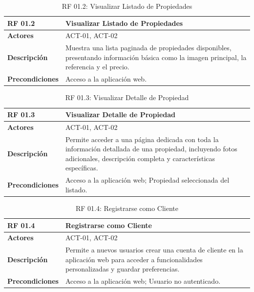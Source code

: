 \begin{table}[H]
\centering
\begin{tabular}{|p{3cm}|p{10cm}|}
\hline
\rowcolor{tealblue}
\textbf{RF 01.2} & \textbf{Visualizar Listado de Propiedades} \\
\hline
\textbf{Actores} & ACT-01, ACT-02 \\
\hline
\textbf{Descripción} & Muestra una lista paginada de propiedades disponibles, presentando información básica como la imagen principal, la referencia y el precio. \\
\hline
\textbf{Precondiciones} & Acceso a la aplicación web. \\
\hline
\end{tabular}
\caption{RF 01.2: Visualizar Listado de Propiedades}
\end{table}

\begin{table}[H]
\centering
\begin{tabular}{|p{3cm}|p{10cm}|}
\hline
\rowcolor{tealblue}
\textbf{RF 01.3} & \textbf{Visualizar Detalle de Propiedad} \\
\hline
\textbf{Actores} & ACT-01, ACT-02 \\
\hline
\textbf{Descripción} & Permite acceder a una página dedicada con toda la información detallada de una propiedad, incluyendo fotos adicionales, descripción completa y características específicas. \\
\hline
\textbf{Precondiciones} & Acceso a la aplicación web; Propiedad seleccionada del listado. \\
\hline
\end{tabular}
\caption{RF 01.3: Visualizar Detalle de Propiedad}
\end{table}

\begin{table}[H]
\centering
\begin{tabular}{|p{3cm}|p{10cm}|}
\hline
\rowcolor{tealblue}
\textbf{RF 01.4} & \textbf{Registrarse como Cliente} \\
\hline
\textbf{Actores} & ACT-01, ACT-02 \\
\hline
\textbf{Descripción} & Permite a nuevos usuarios crear una cuenta de cliente en la aplicación web para acceder a funcionalidades personalizadas y guardar preferencias. \\
\hline
\textbf{Precondiciones} & Acceso a la aplicación web; Usuario no autenticado. \\
\hline
\end{tabular}
\caption{RF 01.4: Registrarse como Cliente}
\end{table}

